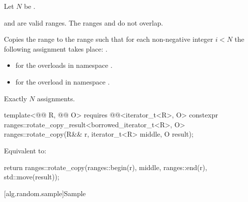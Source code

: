 \begin{itemdescr}
\pnum
Let $N$ be .

\pnum
\expects
{} and  are valid ranges.
The ranges  and 
do not overlap.

\pnum
\effects
Copies the range  to the range 
such that for each non-negative integer $i < N$
the following assignment takes place:
.

\pnum
\returns
\begin{itemize}
\item
   for the overloads in namespace .
\item
   for the overload in namespace .
\end{itemize}

\pnum
\complexity
Exactly $N$ assignments.
\end{itemdescr}

\begin{itemdecl}
template<@@ R, @@ O>
  requires @@<iterator_t<R>, O>
  constexpr ranges::rotate_copy_result<borrowed_iterator_t<R>, O>
    ranges::rotate_copy(R&& r, iterator_t<R> middle, O result);
\end{itemdecl}

\begin{itemdescr}
\pnum
\effects
Equivalent to:
\begin{codeblock}
return ranges::rotate_copy(ranges::begin(r), middle, ranges::end(r), std::move(result));
\end{codeblock}
\end{itemdescr}

[alg.random.sample]{Sample}

